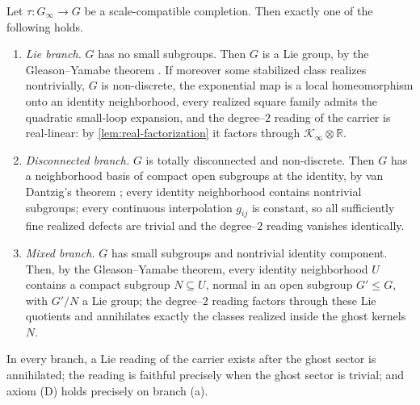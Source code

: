\begin{theorem}
	\label{thm:structure-trichotomy}
	Let \(\tau:G_\infty\to G\) be a scale-compatible completion.  Then
	exactly one of the following holds.
	\begin{enumerate}[label=\textup{(\alph*)}]
		\item
		      \emph{Lie branch.}  \(G\) has no small subgroups.  Then \(G\) is a
		      Lie group, by the Gleason--Yamabe theorem
		      \cite{Gleason1952,Yamabe1953,MontgomeryZippin1955,Tao2014}.
		      If moreover some
		      stabilized class realizes nontrivially, \(G\) is non-discrete, the
		      exponential map is a local homeomorphism onto an identity
		      neighborhood, every realized square family admits the quadratic
		      small-loop expansion, and the degree--\(2\) reading of the carrier
		      is real-linear: by \cref{lem:real-factorization} it factors
		      through \(\mathcal K_\infty\otimes\mathbb R\).
		\item
		      \emph{Disconnected branch.}  \(G\) is totally disconnected and
		      non-discrete.  Then \(G\) has a neighborhood basis of compact open
		      subgroups at the identity, by van Dantzig's theorem
		      \cite{vanDantzig1936}; every
		      identity neighborhood contains nontrivial subgroups; every
		      continuous interpolation \(g_{ij}\) is constant, so all
		      sufficiently fine realized defects are trivial and the
		      degree--\(2\) reading vanishes identically.
		\item
		      \emph{Mixed branch.}  \(G\) has small subgroups and nontrivial
		      identity component.  Then, by the Gleason--Yamabe theorem, every
		      identity neighborhood \(U\) contains a compact subgroup
		      \(N\subseteq U\), normal in an open subgroup \(G'\le G\), with
		      \(G'/N\) a Lie group; the degree--\(2\) reading factors through
		      these Lie quotients and annihilates exactly the classes realized
		      inside the ghost kernels \(N\).
	\end{enumerate}
	In every branch, a Lie reading of the carrier exists after the ghost
	sector is annihilated; the reading is faithful precisely when the
	ghost sector is trivial; and axiom \textup{(D)} holds precisely on
	branch \textup{(a)}.
\end{theorem}
